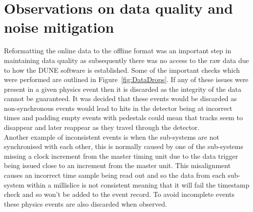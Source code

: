 \section{Observations on data quality and noise mitigation} \label{All the noise} %
Reformatting the online data to the offline format was an important step in maintaining data quality as subsequently there was no access to the raw data due to how the DUNE software is established. Some of the important checks which were performed are outlined in Figure~\ref{fig:DataDrops}. If any of these issues were present in a given physics event then it is discarded as the integrity of the data cannot be guaranteed. It was decided that these events would be discarded as non-synchronous events would lead to hits in the detector being at incorrect times and padding empty events with pedestals could mean that tracks seem to disappear and later reappear as they travel through the detector. \\

Another example of inconsistent events is when the sub-systems are not synchronised with each other, this is normally caused by one of the sub-systems missing a clock increment from the master timing unit due to the data trigger being issued close to an increment from the master unit. This misalignment causes an incorrect time sample being read out and so the data from each sub-system within a millislice is not consistent meaning that it will fail the timestamp check and so won't be added to the event record. To avoid incomplete events these physics events are also discarded when observed. \\

